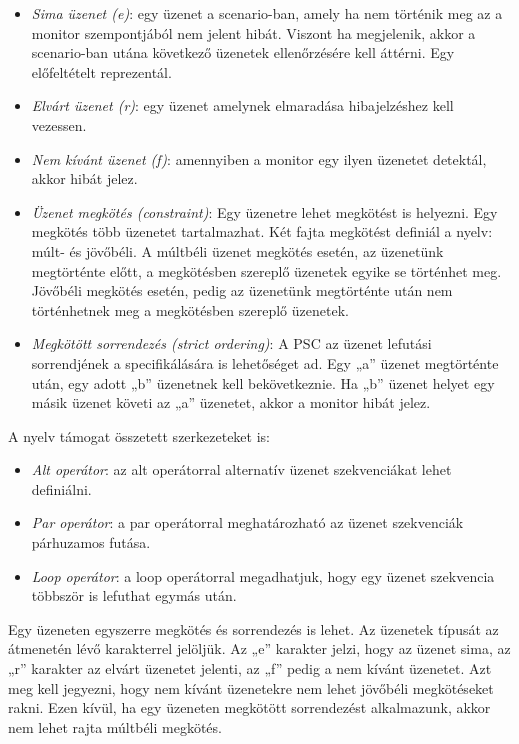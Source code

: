 \begin{itemize}
    \item \textit{Sima üzenet (e)}: egy üzenet a scenario-ban, amely ha nem történik meg az a monitor szempontjából nem jelent hibát.
    Viszont ha megjelenik, akkor a scenario-ban utána következő üzenetek ellenőrzésére kell áttérni.
    Egy előfeltételt reprezentál.
    \item \textit{Elvárt üzenet (r)}: egy üzenet amelynek elmaradása hibajelzéshez kell vezessen.
    \item \textit{Nem kívánt üzenet (f)}: amennyiben a monitor egy ilyen üzenetet detektál, akkor hibát jelez.
    \item \textit{Üzenet megkötés (constraint)}: Egy üzenetre lehet megkötést is helyezni.
    Egy megkötés több üzenetet tartalmazhat.
    Két fajta megkötést definiál a nyelv: múlt- és jövőbéli.
    A múltbéli üzenet megkötés esetén, az üzenetünk megtörténte előtt, a megkötésben szereplő üzenetek egyike se történhet meg.
    Jövőbéli megkötés esetén, pedig az üzenetünk megtörténte után nem történhetnek meg a megkötésben szereplő üzenetek.
    \item \textit{Megkötött sorrendezés (strict ordering)}: A PSC az üzenet lefutási sorrendjének a specifikálására is lehetőséget ad.
    Egy „a” üzenet megtörténte után, egy adott „b” üzenetnek kell bekövetkeznie.
    Ha „b” üzenet helyet egy másik üzenet követi az „a” üzenetet, akkor a monitor hibát jelez.
\end{itemize}

A nyelv támogat összetett szerkezeteket is:

\begin{itemize}
    \item \textit{Alt operátor}: az alt operátorral alternatív üzenet szekvenciákat lehet definiálni.
    \item \textit{Par operátor}: a par operátorral meghatározható az üzenet szekvenciák párhuzamos futása.
    \item \textit{Loop operátor}: a loop operátorral megadhatjuk, hogy egy üzenet szekvencia többször is lefuthat egymás után.
\end{itemize}

Egy üzeneten egyszerre megkötés és sorrendezés is lehet.
Az üzenetek típusát az átmenetén lévő karakterrel jelöljük.
Az „e” karakter jelzi, hogy az üzenet sima, az „r” karakter az elvárt üzenetet jelenti, az „f” pedig a nem kívánt üzenetet.
Azt meg kell jegyezni, hogy nem kívánt üzenetekre nem lehet jövőbéli megkötéseket rakni.
Ezen kívül, ha egy üzeneten megkötött sorrendezést alkalmazunk, akkor nem lehet rajta múltbéli megkötés.


